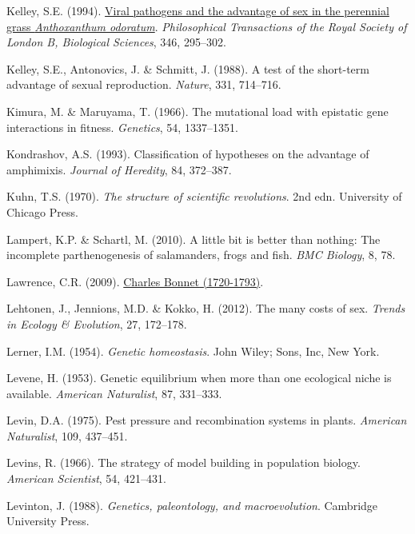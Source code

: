 \documentclass[
  letterpaper,
]{book}
\newlength{\cslhangindent}
\newenvironment{CSLReferences}[2] %
 {\begin{list}{}{%
  \setlength{\itemindent}{0pt}
  \setlength{\leftmargin}{0pt}
  \setlength{\parsep}{0pt}
  \ifodd #1
   \setlength{\leftmargin}{\cslhangindent}
   \setlength{\itemindent}{-1\cslhangindent}
  \fi
  \setlength{\itemsep}{#2\baselineskip}}}
 {\end{list}}
\begin{document}
\begin{CSLReferences}{1}{0}
Kelley, S.E. (1994). \href{https://doi.org/10.1098/rstb.1994.0146}{Viral
pathogens and the advantage of sex in the perennial grass
\emph{{A}nthoxanthum odoratum}}. \emph{Philosophical Transactions of the
Royal Society of London B, Biological Sciences}, 346, 295--302.

Kelley, S.E., Antonovics, J. \& Schmitt, J. (1988). A test of the
short-term advantage of sexual reproduction. \emph{Nature}, 331,
714--716.

Kimura, M. \& Maruyama, T. (1966). The mutational load with epistatic
gene interactions in fitness. \emph{Genetics}, 54, 1337--1351.

Kondrashov, A.S. (1993). Classification of hypotheses on the advantage
of amphimixis. \emph{Journal of Heredity}, 84, 372--387.

Kuhn, T.S. (1970). \emph{The structure of scientific revolutions}. 2nd
edn. University of Chicago Press.

Lampert, K.P. \& Schartl, M. (2010). A little bit is better than
nothing: The incomplete parthenogenesis of salamanders, frogs and fish.
\emph{BMC Biology}, 8, 78.

Lawrence, C.R. (2009). \href{https://hdl.handle.net/10776/1745}{{Charles
Bonnet} (1720-1793)}.

Lehtonen, J., Jennions, M.D. \& Kokko, H. (2012). The many costs of sex.
\emph{Trends in Ecology \& Evolution}, 27, 172--178.

Lerner, I.M. (1954). \emph{Genetic homeostasis}. John Wiley; Sons, Inc,
New York.

Levene, H. (1953). Genetic equilibrium when more than one ecological
niche is available. \emph{American Naturalist}, 87, 331--333.

Levin, D.A. (1975). Pest pressure and recombination systems in plants.
\emph{American Naturalist}, 109, 437--451.

Levins, R. (1966). The strategy of model building in population biology.
\emph{American Scientist}, 54, 421--431.

Levinton, J. (1988). \emph{Genetics, paleontology, and macroevolution}.
Cambridge University Press.


\end{CSLReferences}
\end{document}
